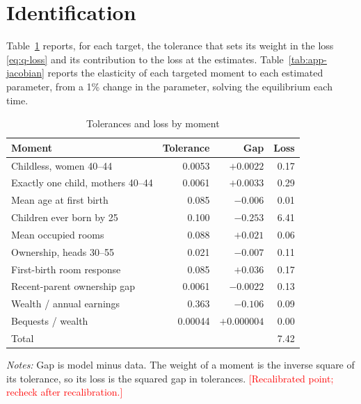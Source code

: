 \section{Identification}
\label{app:identification}

Table~\ref{tab:app-loss} reports, for each target, the tolerance that sets
its weight in the loss \eqref{eq:q-loss} and its contribution to the loss at
the estimates. Table~\ref{tab:app-jacobian} reports the elasticity of each
targeted moment to each estimated parameter, from a 1\% change in the
parameter, solving the equilibrium each time.

\begin{table}[h]
\centering
\caption{Tolerances and loss by moment}
\label{tab:app-loss}
\small
\begin{tabularx}{0.8\textwidth}{@{}X r r r@{}}
\toprule
Moment & Tolerance & Gap & Loss \\
\midrule
Childless, women 40--44 & 0.0053 & $+0.0022$ & 0.17 \\
Exactly one child, mothers 40--44 & 0.0061 & $+0.0033$ & 0.29 \\
Mean age at first birth & 0.085 & $-0.006$ & 0.01 \\
Children ever born by 25 & 0.100 & $-0.253$ & 6.41 \\
Mean occupied rooms & 0.088 & $+0.021$ & 0.06 \\
Ownership, heads 30--55 & 0.021 & $-0.007$ & 0.11 \\
First-birth room response & 0.085 & $+0.036$ & 0.17 \\
Recent-parent ownership gap & 0.0061 & $-0.0022$ & 0.13 \\
Wealth / annual earnings & 0.363 & $-0.106$ & 0.09 \\
Bequests / wealth & 0.00044 & $+0.000004$ & 0.00 \\
\midrule
Total & & & 7.42 \\
\bottomrule
\end{tabularx}
\par\smallskip
\begin{minipage}{0.8\linewidth}
\footnotesize\textit{Notes:} Gap is model minus data. The weight of a
moment is the inverse square of its tolerance, so its loss is the squared
gap in tolerances. \textcolor{red}{[Recalibrated point; recheck after
recalibration.]}
\end{minipage}
\end{table}

